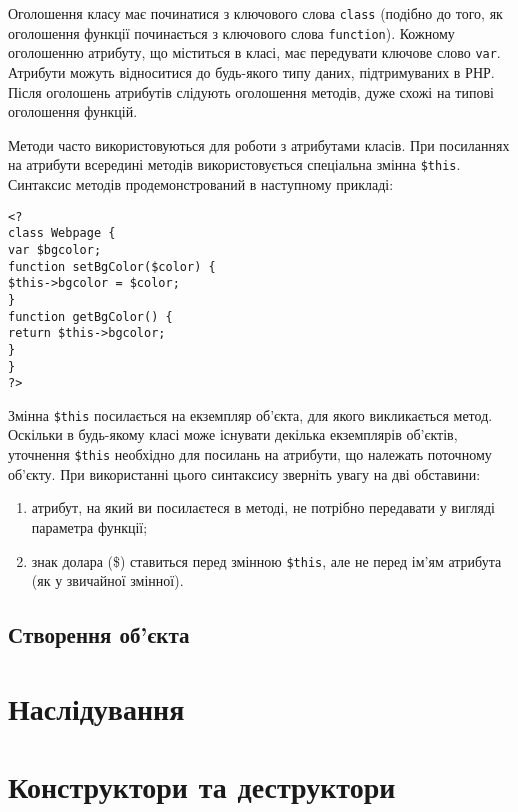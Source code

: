 Оголошення класу має починатися з ключового слова \verb|class| (подібно до того, як оголошення функції починається з ключового слова \verb|function|). Кожному оголошенню атрибуту, що міститься в класі, має передувати ключове слово \verb|var|. Атрибути можуть відноситися до будь-якого типу даних, підтримуваних в РНР. Після оголошень атрибутів слідують оголошення методів, дуже схожі на типові оголошення функцій.

Методи часто використовуються для роботи з атрибутами класів. При посиланнях на атрибути всередині методів використовується спеціальна змінна \verb|$this|. Синтаксис методів продемонстрований в наступному прикладі:

\begin{lstlisting}[caption=Приклад створення методів]
<?
class Webpage {
var $bgcolor;
function setBgColor($color) {
$this->bgcolor = $color;
}
function getBgColor() {
return $this->bgcolor;
}
}
?> 
\end{lstlisting}

Змінна \verb|$this| посилається на екземпляр об'єкта, для якого викликається метод. Оскільки в будь-якому класі може існувати декілька екземплярів об'єктів, уточнення \verb|$this| необхідно для посилань на атрибути, що належать поточному об'єкту. При використанні цього синтаксису зверніть увагу на дві обставини:

\begin{enumerate}
\item атрибут, на який ви посилаєтеся в методі, не потрібно передавати у вигляді параметра функції;
\item знак долара (\$) ставиться перед змінною \verb|$this|, але не перед ім'ям атрибута (як у звичайної змінної).
\end{enumerate}

\subsection{Створення об'єкта}


\section{Наслідування}

\section{Конструктори та деструктори}

